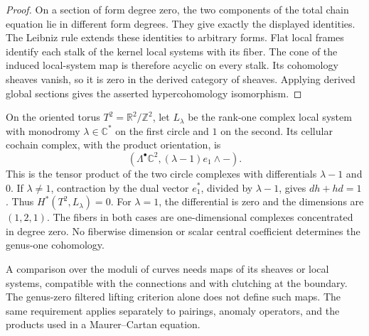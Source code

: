 \begin{proof}
On a section of form degree zero, the two components of the total chain equation lie in different form degrees.
They give exactly the displayed identities.
The Leibniz rule extends these identities to arbitrary forms.
Flat local frames identify each stalk of the kernel local systems with its fiber.
The cone of the induced local-system map is therefore acyclic on every stalk.
Its cohomology sheaves vanish, so it is zero in the derived category of sheaves.
Applying derived global sections gives the asserted hypercohomology isomorphism.
\end{proof}

\begin{example}
\label{ex:cbc26-torus-monodromy}
On the oriented torus $T^2=\mathbb R^2/\mathbb Z^2$, let $L_\lambda$ be the rank-one complex local system with monodromy $\lambda\in\mathbb C^*$ on the first circle and $1$ on the second.
Its cellular cochain complex, with the product orientation, is
\[
 \left(\Lambda^\bullet\mathbb C^2,
       (\lambda-1)e_1\wedge-\right).
\]
This is the tensor product of the two circle complexes with differentials $\lambda-1$ and $0$.
If $\lambda\ne1$, contraction by the dual vector $e_1^*$, divided by $\lambda-1$, gives $dh+hd=1$.
Thus $H^*(T^2,L_\lambda)=0$.
For $\lambda=1$, the differential is zero and the dimensions are $(1,2,1)$.
The fibers in both cases are one-dimensional complexes concentrated in degree zero.
No fiberwise dimension or scalar central coefficient determines the genus-one cohomology.
\end{example}

A comparison over the moduli of curves needs maps of its sheaves or local systems, compatible with the connections and with clutching at the boundary.
The genus-zero filtered lifting criterion alone does not define such maps.
The same requirement applies separately to pairings, anomaly operators, and the products used in a Maurer--Cartan equation.
